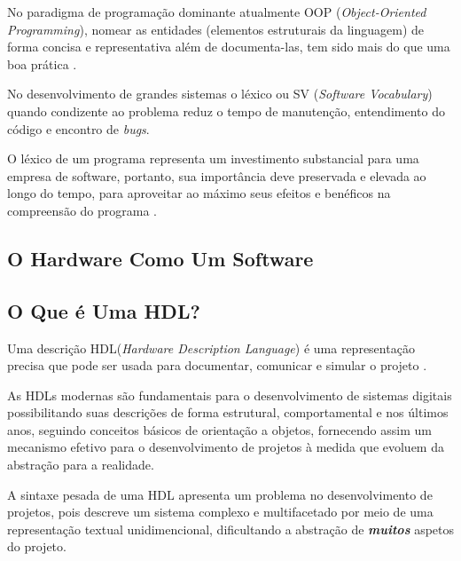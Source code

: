 \documentclass[12pt, twocolumn, a4paper]{article}
\begin{document}

No paradigma de programação dominante atualmente OOP (\textit{Object-Oriented Programming}), nomear as entidades (elementos estruturais da linguagem) de forma concisa e representativa além de documenta-las, tem sido mais do que uma boa prática .

 No desenvolvimento de grandes sistemas o léxico ou SV (\textit{Software Vocabulary}) quando condizente ao problema reduz o tempo de manutenção, entendimento do código e encontro de \textit{bugs}. 

O léxico de um programa representa um investimento substancial para uma empresa de software, portanto, sua importância deve preservada e elevada ao longo do tempo, para aproveitar ao máximo seus efeitos e benéficos na compreensão do programa \cite{Antoniol2007}.

	\subsection{O Hardware Como Um Software}
\quad 

	\subsection{O Que é Uma HDL?}

\quad Uma descrição HDL(\textit{Hardware Description Language}) é uma representação precisa que pode ser usada para documentar, comunicar e simular o projeto \cite{Miller-Karlow}.

As HDLs modernas são fundamentais para o desenvolvimento de sistemas digitais possibilitando suas descrições de forma estrutural, comportamental e nos últimos anos, seguindo conceitos básicos de orientação a objetos, fornecendo assim um mecanismo efetivo para o desenvolvimento de projetos à medida que evoluem da abstração para a realidade.

A sintaxe pesada de uma HDL apresenta um problema no desenvolvimento de projetos, pois descreve um sistema complexo e multifacetado por meio de uma representação textual unidimencional, dificultando a abstração de \textit{\textbf{muitos}} aspetos do projeto.
\end{document}
